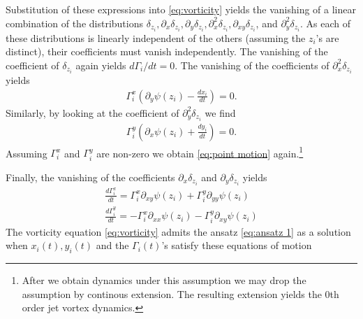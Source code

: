 \documentclass[12pt]{amsart}
\theoremstyle{remark}
\begin{document}
Substitution of these expressions into \eqref{eq:vorticity} yields
the vanishing of
a linear combination of the distributions
$\delta_{z_i},\partial_x\delta_{z_i},\partial_y \delta_{z_i}, \partial_x^2 \delta_{z_i},
 \partial_{xy} \delta_{z_i}$, and $\partial_y^2 \delta_{z_i}$.
As each of these distributions is linearly independent
of the others (assuming the $z_i$'s are distinct),
their coefficients must vanish independently.
The vanishing of the coefficient of $\delta_{z_i}$ again yields $d\Gamma_i / dt = 0$.
The vanishing of the coefficients of $\partial_x^2 \delta_{z_i}$ yields
\begin{align*}
  \Gamma_i^x \left( \partial_y \psi(z_i) - \frac{dx_i}{dt} \right) = 0.
\end{align*}
Similarly, by looking at the coefficient of $\partial_y^2 \delta_{z_i}$
we find
\begin{align*}
  \Gamma_i^y \left( \partial_x \psi (z_i) +\frac{dy_i}{dt} \right) = 0.
\end{align*}
Assuming $\Gamma_i^x$ and $\Gamma_i^y$ are non-zero we
obtain \eqref{eq:point motion} again.\footnote{
  After we obtain dynamics under this assumption
  we may drop the assumption by continous extension.
  The resulting extension yields the $0$th order
  jet vortex dynamics.
}

Finally, the vanishing of the coefficients $\partial_x \delta_{z_i}$ and $\partial_y \delta_{z_i}$ yields
\begin{align*}
  \frac{d\Gamma^x_i}{dt} = \Gamma_i^x \partial_{xy}\psi(z_i) + \Gamma_i^y \partial_{yy}\psi(z_i) \\
  \frac{d\Gamma^y_i}{dt} = -\Gamma_i^x \partial_{xx} \psi(z_i) - \Gamma_i^y \partial_{xy} \psi(z_i)
\end{align*}
The vorticity equation \eqref{eq:vorticity} admits the ansatz \eqref{eq:ansatz 1} as a solution when $x_i(t),y_i(t)$ and the $\Gamma_i(t)$'s satisfy these equations of motion
\end{document}
